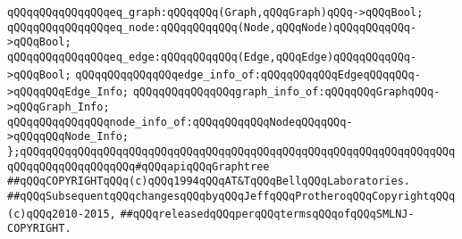 \verb|qQQqqQQqqQQqqQQqeq_graph:qQQqqQQq(Graph,qQQqGraph)qQQq->qQQqBool;|\newline
\verb|qQQqqQQqqQQqqQQqeq_node:qQQqqQQqqQQq(Node,qQQqNode)qQQqqQQqqQQq->qQQqBool;|\newline
\verb|qQQqqQQqqQQqqQQqeq_edge:qQQqqQQqqQQq(Edge,qQQqEdge)qQQqqQQqqQQq->qQQqBool;|\newline
\newline
\verb|qQQqqQQqqQQqqQQqedge_info_of:qQQqqQQqqQQqEdgeqQQqqQQq->qQQqqQQqEdge_Info;|\newline
\verb|qQQqqQQqqQQqqQQqgraph_info_of:qQQqqQQqGraphqQQq->qQQqGraph_Info;|\newline
\verb|qQQqqQQqqQQqqQQqnode_info_of:qQQqqQQqqQQqNodeqQQqqQQq->qQQqqQQqNode_Info;|\newline
\newline
\verb|};qQQqqQQqqQQqqQQqqQQqqQQqqQQqqQQqqQQqqQQqqQQqqQQqqQQqqQQqqQQqqQQqqQQqqQQqqQQqqQQqqQQqqQQq#qQQqapiqQQqGraphtree|\newline
\newline
\newline
\newline
\verb|##qQQqCOPYRIGHTqQQq(c)qQQq1994qQQqAT&TqQQqBellqQQqLaboratories.|\newline
\verb|##qQQqSubsequentqQQqchangesqQQqbyqQQqJeffqQQqProtheroqQQqCopyrightqQQq(c)qQQq2010-2015,|\newline
\verb|##qQQqreleasedqQQqperqQQqtermsqQQqofqQQqSMLNJ-COPYRIGHT.|\newline

